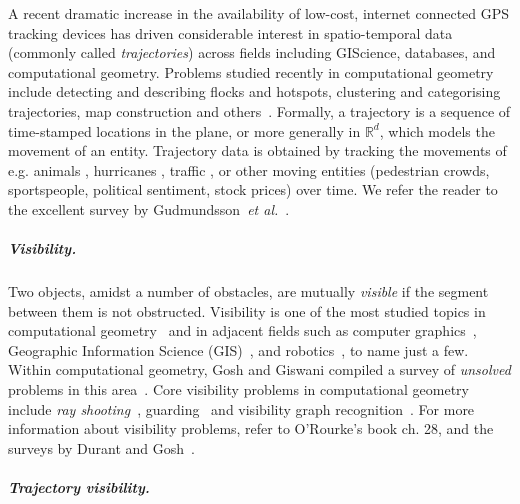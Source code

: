 \documentclass[UKenglish]{lipics-v2019}
\newcommand{\etal}{\textit{et al.}\xspace}
\newcommand{\mkmbb}[1]{\ensuremath{\mathbb{#1}}\xspace}
\newcommand{\R}{\mkmbb{R}}
\begin{document}
A recent dramatic increase in the availability of low-cost, internet connected GPS tracking devices has driven considerable interest in spatio-temporal data (commonly called {\em trajectories}) across fields including GIScience, databases, and computational geometry. 
Problems studied recently in computational geometry include detecting and describing flocks \cite{AnderssonGLW07, BenkertGHW08, LaubeKI04} and hotspots, clustering and categorising trajectories, map construction and others~\cite{bbgll-dcpcs-11,grsc-pcecu-07,gs-tcmrm-99,lhw-tc-07,vgk-dsmt-02}.
Formally, a trajectory is a 
sequence of time-stamped locations 
in the plane, or more generally in $\R^d$, which
models the movement of an entity.
Trajectory data is obtained by tracking the movements of e.g. animals \cite{BovetB88,Calenge200934,gal-nmibc-09}, hurricanes \cite{Stohl1998947}, traffic \cite{lltx-dftf-10}, or other moving entities \cite{dwf-rpm-09} (pedestrian crowds, sportspeople, political sentiment, stock prices) over time.
We refer the reader to the excellent survey by Gudmundsson~\etal~\cite{GudmundssonLW17}.

\subparagraph {Visibility.}
Two objects, amidst a number of obstacles, are mutually \emph{visible} if the segment between them is not obstructed. 
Visibility is one of the most studied topics in computational geometry~\cite {moet,welzl1985constructing,POCCHIOLA1996279}
and in adjacent fields such as computer graphics~\cite{durand2000multidisciplinary}, Geographic Information Science (GIS)~\cite{FM03}, and robotics~\cite {moet}, to name just a few.
Within computational geometry, Gosh and Giswani compiled a survey of {\em unsolved} problems in this area~\cite {Ghosh:2013:UPV:2543581.2543589}.
Core visibility problems in computational geometry include {\em ray shooting}~\cite{agarwal1993ray,de1993ray,chazelle1994ray}, guarding~\cite {Chvatal75,Fisk78,safak2009art} and visibility graph recognition~\cite{cardinal2017recognition}.
For more information about visibility problems, refer to O'Rourke's book \cite{ORourke87} ch. 28, and the surveys by Durant \cite{durand2000multidisciplinary} and Gosh~\cite{Ghosh:2013:UPV:2543581.2543589}. 

\subparagraph {Trajectory visibility.}
\end{document}
